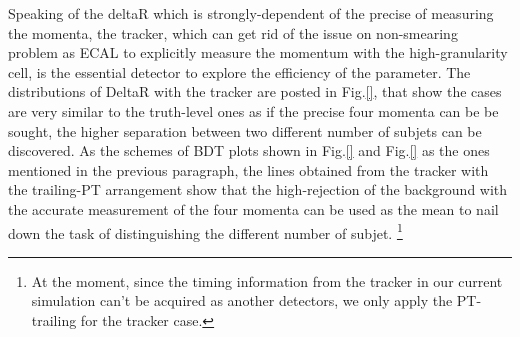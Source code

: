 Speaking of the deltaR which is strongly-dependent of the precise of measuring the momenta, the tracker, which can get rid of the issue on non-smearing problem as ECAL to explicitly measure the momentum with the high-granularity cell, is the essential detector to explore the efficiency of the parameter. The distributions of DeltaR with the tracker are posted in Fig.\ref{}, that show the cases are very similar to the truth-level ones as if the precise four momenta can be be sought, the higher separation between two different number of subjets can be discovered. As the schemes of BDT plots shown in Fig.\ref{} and Fig.\ref{} as the ones mentioned in the previous paragraph, the lines obtained from the tracker with the trailing-PT arrangement show that the high-rejection of the background with the accurate measurement of the four momenta can be used as the mean to nail down the task of distinguishing the different number of subjet. \footnote{At the moment, since the timing information from the tracker in our current simulation can't be acquired as another detectors, we only apply the PT-trailing for the tracker case.}\\








